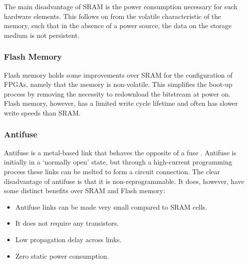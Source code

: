 The main disadvantage of \gls{SRAM} is the power consumption necessary for such
hardware elements. This follows on from the volatile characteristic of the
memory, such that in the absence of a power source, the data on the storage
medium is not persistent.

\subsubsection{Flash Memory}
\label{fpga:configuration:flash}
Flash memory holds some improvements over \gls{SRAM} for the configuration of
\glspl{FPGA}, namely that the memory is non-volatile. This simplifies the
boot-up process by removing the necessity to redownload the bitstream at power
on. Flash memory, however, has a limited write cycle lifetime and often has
slower write speeds than \gls{SRAM}.

\subsubsection{Antifuse}
\label{fpga:configuration:antifuse}
Antifuse is a metal-based link that behaves the opposite of a fuse
\cite{Hauck:2007}. Antifuse is initially in a `normally open' state, but through
a high-current programming process these links can be melted to form a circuit
connection. The clear disadvantage of antifuse is that it is non-reprogrammable.
It does, however, have some distinct benefits over \gls{SRAM} and Flash memory:
\begin{itemize}
    \item Antifuse links can be made very small compared to \gls{SRAM} cells.
    \item It does not require any transistors.
    \item Low propagation delay across links.
    \item Zero static power consumption.
\end{itemize}
